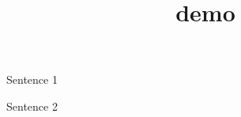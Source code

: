 \documentclass{article}
\title{demo}
\begin{document}
\maketitle

Sentence 1

Sentence 2
\end{document}

